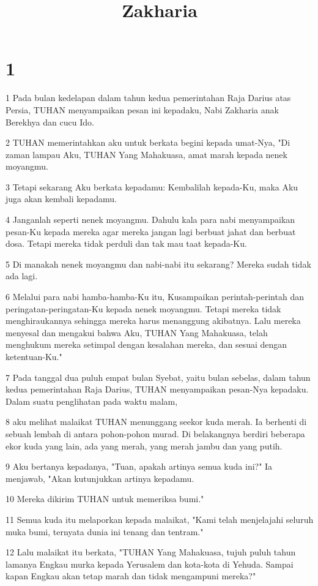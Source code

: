 

\title{Zakharia}


\chapter{1}

\par 1 Pada bulan kedelapan dalam tahun kedua pemerintahan Raja Darius atas Persia, TUHAN menyampaikan pesan ini kepadaku, Nabi Zakharia anak Berekhya dan cucu Ido.
\par 2 TUHAN memerintahkan aku untuk berkata begini kepada umat-Nya, "Di zaman lampau Aku, TUHAN Yang Mahakuasa, amat marah kepada nenek moyangmu.
\par 3 Tetapi sekarang Aku berkata kepadamu: Kembalilah kepada-Ku, maka Aku juga akan kembali kepadamu.
\par 4 Janganlah seperti nenek moyangmu. Dahulu kala para nabi menyampaikan pesan-Ku kepada mereka agar mereka jangan lagi berbuat jahat dan berbuat dosa. Tetapi mereka tidak perduli dan tak mau taat kepada-Ku.
\par 5 Di manakah nenek moyangmu dan nabi-nabi itu sekarang? Mereka sudah tidak ada lagi.
\par 6 Melalui para nabi hamba-hamba-Ku itu, Kusampaikan perintah-perintah dan peringatan-peringatan-Ku kepada nenek moyangmu. Tetapi mereka tidak menghiraukannya sehingga mereka harus menanggung akibatnya. Lalu mereka menyesal dan mengakui bahwa Aku, TUHAN Yang Mahakuasa, telah menghukum mereka setimpal dengan kesalahan mereka, dan sesuai dengan ketentuan-Ku."
\par 7 Pada tanggal dua puluh empat bulan Syebat, yaitu bulan sebelas, dalam tahun kedua pemerintahan Raja Darius, TUHAN menyampaikan pesan-Nya kepadaku. Dalam suatu penglihatan pada waktu malam,
\par 8 aku melihat malaikat TUHAN menunggang seekor kuda merah. Ia berhenti di sebuah lembah di antara pohon-pohon murad. Di belakangnya berdiri beberapa ekor kuda yang lain, ada yang merah, yang merah jambu dan yang putih.
\par 9 Aku bertanya kepadanya, "Tuan, apakah artinya semua kuda ini?" Ia menjawab, "Akan kutunjukkan artinya kepadamu.
\par 10 Mereka dikirim TUHAN untuk memeriksa bumi."
\par 11 Semua kuda itu melaporkan kepada malaikat, "Kami telah menjelajahi seluruh muka bumi, ternyata dunia ini tenang dan tentram."
\par 12 Lalu malaikat itu berkata, "TUHAN Yang Mahakuasa, tujuh puluh tahun lamanya Engkau murka kepada Yerusalem dan kota-kota di Yehuda. Sampai kapan Engkau akan tetap marah dan tidak mengampuni mereka?"
